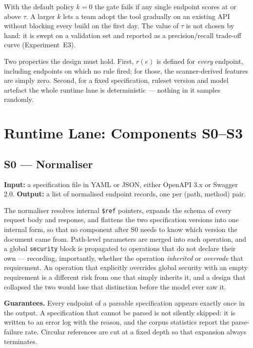 \documentclass[conference]{IEEEtran}
\begin{document}
With the default policy $k=0$ the gate fails if any single endpoint scores at or above
$\tau$. A larger $k$ lets a team adopt the tool gradually on an existing API without
blocking every build on the first day. The value of $\tau$ is not chosen by hand: it is
swept on a validation set and reported as a precision/recall trade-off curve
(Experiment~E3).

Two properties the design must hold. First, $r(e)$ is defined for \emph{every} endpoint,
including endpoints on which no rule fired; for those, the scanner-derived features are
simply zero. Second, for a fixed specification, ruleset version and model artefact the whole
runtime lane is deterministic --- nothing in it samples randomly.

\section{Runtime Lane: Components S0--S3}

\subsection{S0 --- Normaliser}
\textbf{Input:} a specification file in YAML or JSON, either OpenAPI 3.x or Swagger 2.0.
\textbf{Output:} a list of normalised endpoint records, one per (path, method) pair.

The normaliser resolves internal \texttt{\$ref} pointers, expands the schema of every request
body and response, and flattens the two specification versions into one internal form, so
that no component after S0 needs to know which version the document came from. Path-level
parameters are merged into each operation, and a global \texttt{security} block is propagated
to operations that do not declare their own --- recording, importantly, whether the operation
\emph{inherited} or \emph{overrode} that requirement. An operation that explicitly overrides
global security with an empty requirement is a different risk from one that simply inherits
it, and a design that collapsed the two would lose that distinction before the model ever
saw it.

\textbf{Guarantees.} Every endpoint of a parsable specification appears exactly once in the
output. A specification that cannot be parsed is not silently skipped: it is written to an
error log with the reason, and the corpus statistics report the parse-failure rate. Circular
references are cut at a fixed depth so that expansion always terminates.
\end{document}
